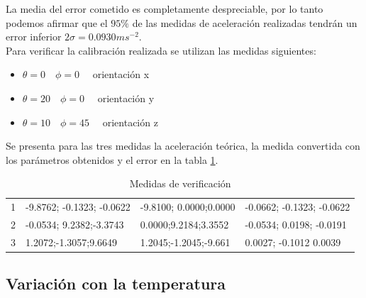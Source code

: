 \documentclass[main]{subfiles}
\begin{document}
La media del error cometido es completamente despreciable, por lo tanto podemos afirmar que el $95\% $ de las medidas de aceleración realizadas tendrán un error inferior $2\sigma=0.0930ms^{-2}$.\\
 
Para verificar la calibración realizada se utilizan las medidas siguientes:
\begin{itemize}
\item $\theta = 0 \quad \phi = 0 \quad$ orientación x
\item $\theta = 20 \quad \phi = 0 \quad$ orientación y
\item $\theta = 10 \quad \phi = 45 \quad$ orientación z
\end{itemize}

Se presenta para las tres medidas la aceleración teórica, la medida convertida con los parámetros obtenidos y el error en la tabla \ref{tab:diff}. 

\begin{table}[H]
\centering
\begin{tabular}{|p{90pt}|p{90pt}|p{90pt}|p{90pt}|}
\hline
\cellcolor[gray]{0.8}{Medida} & \cellcolor[gray]{0.8}{Aceleración Medida ($ms^{-2}$)}&\cellcolor[gray]{0.8}{Aceleración teórica($m^{-2}$)}& \cellcolor[gray]{0.8}{Error($ms^{-2}$)} \\
\hline
1 &  -9.8762; -0.1323; -0.0622   & -9.8100; 0.0000;0.0000     & -0.0662; -0.1323; -0.0622\\
\hline
2 & -0.0534; 9.2382;-3.3743       & 0.0000;9.2184;3.3552     & -0.0534; 0.0198; -0.0191\\
\hline
3 & 1.2072;-1.3057;9.6649       & 1.2045;-1.2045;-9.661   & 0.0027; -0.1012 0.0039\\
\hline
\end{tabular}
\caption{Medidas de verificación}
\label{tab:diff}
\end{table}


\subsection{Variación con la temperatura}
\end{document}
